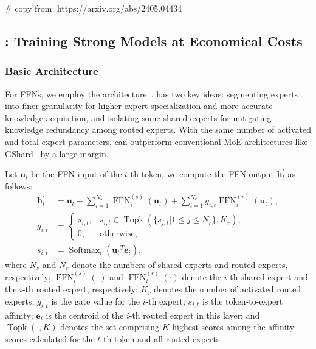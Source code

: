# copy from: https://arxiv.org/abs/2405.04434

\subsection{\dsmoe{}: Training Strong Models at Economical Costs}

\subsubsection{Basic Architecture}

For FFNs, we employ the \dsmoe{} architecture~\citep{deepseekmoe}. 
\dsmoe{} has two key ideas: segmenting experts into finer granularity for higher expert specialization and more accurate knowledge acquisition, and isolating some shared experts for mitigating knowledge redundancy among routed experts. 
With the same number of activated and total expert parameters, \dsmoe{} can outperform conventional MoE architectures like GShard~\citep{gshard} by a large margin. 

Let $\mathbf{u}_{t}$ be the FFN input of the $t$-th token, we compute the FFN output $\mathbf{h}_{t}^{\prime}$ as follows:
\begin{align}
    \mathbf{h}_{t}^{\prime} & = \mathbf{u}_{t} + \sum_{i=1}^{N_{s}} {\operatorname{FFN}^{(s)}_{i}\left( \mathbf{u}_{t} \right)} + \sum_{i=1}^{N_r} {g_{i,t} \operatorname{FFN}^{(r)}_{i}\left( \mathbf{u}_{t} \right)}, \\
    g_{i,t} & = \begin{cases} 
    s_{i,t}, & s_{i,t} \in \operatorname{Topk} (\{ s_{j, t} | 1 \leq j \leq N_r \}, K_{r}), \\
    0, & \text{otherwise}, 
    \end{cases} \\
    s_{i,t} & = \operatorname{Softmax}_i \left( {\mathbf{u}_{t}}^{T} \mathbf{e}_{i} \right),
\end{align}
where $N_{s}$ and $N_r$ denote the numbers of shared experts and routed experts, respectively; 
$\operatorname{FFN}^{(s)}_{i}(\cdot)$ and $\operatorname{FFN}^{(r)}_{i}(\cdot)$ denote the $i$-th shared expert and the $i$-th routed expert, respectively; 
$K_{r}$ denotes the number of activated routed experts; 
$g_{i,t}$ is the gate value for the $i$-th expert; 
$s_{i,t}$ is the token-to-expert affinity; 
$\mathbf{e}_{i}$ is the centroid of the $i$-th routed expert in this layer; 
and $\operatorname{Topk}(\cdot, K)$ denotes the set comprising $K$ highest scores among the affinity scores calculated for the $t$-th token and all routed experts.

